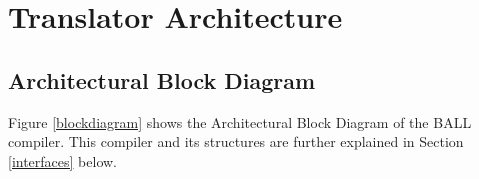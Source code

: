 \documentclass[letterpaper,oneside,12pt, pdftex]{report}
\begin{document}
\pagestyle{empty} %






\tableofcontents %
\cleardoublepage %

\pagestyle{fancy} %















\label{evolution}

\chapter{Translator Architecture}\label{architecture}

\section{Architectural Block Diagram}
Figure \ref{blockdiagram} shows the Architectural Block Diagram of the
BALL compiler. This compiler and its structures are further explained
in Section \ref{interfaces} below.
\end{document}
